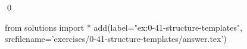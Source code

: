 
\begin{ex}
  \label{ex:0-41-structure-templates}
  
  \qed
\end{ex}
\begin{python0}
from solutions import *
add(label="ex:0-41-structure-templates",
    srcfilename='exercises/0-41-structure-templates/answer.tex')
\end{python0}
